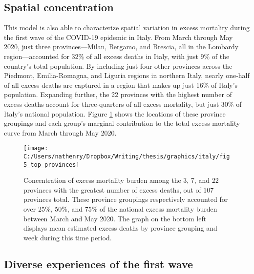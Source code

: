 \documentclass[
]{article}
\begin{document}
\hypertarget{spatial-concentration}{%
\subsection{Spatial concentration}\label{spatial-concentration}}

This model is also able to characterize spatial variation in excess mortality during the first wave of the COVID-19 epidemic in Italy. From March through May 2020, just three provinces---Milan, Bergamo, and Brescia, all in the Lombardy region---accounted for 32\% of all excess deaths in Italy, with just 9\% of the country's total population. By including just four other provinces across the Piedmont, Emilia-Romagna, and Liguria regions in northern Italy, nearly one-half of all excess deaths are captured in a region that makes up just 16\% of Italy's population. Expanding further, the 22 provinces with the highest number of excess deaths account for three-quarters of all excess mortality, but just 30\% of Italy's national population. Figure \ref{fig:top-provinces} shows the locations of these province groupings and each group's marginal contribution to the total excess mortality curve from March through May 2020.

\begin{figure}[!p]

{\centering \texttt{[image: C:/Users/nathenry/Dropbox/Writing/thesis/graphics/italy/fig5\_top\_provinces]} 

}

\caption{Concentration of excess mortality burden among the 3, 7, and 22 provinces with the greatest number of excess deaths, out of 107 provinces total. These province groupings respectively accounted for over 25\%, 50\%, and 75\% of the national excess mortality burden between March and May 2020. The graph on the bottom left displays mean estimated excess deaths by province grouping and week during this time period.}\label{fig:top-provinces}
\end{figure}

\hypertarget{diverse-experiences-of-the-first-wave}{%
\subsection{Diverse experiences of the first wave}\label{diverse-experiences-of-the-first-wave}}
\end{document}
